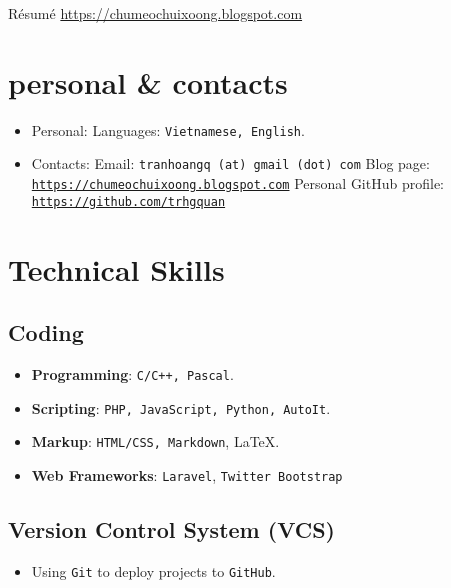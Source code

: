\documentclass{article}
\renewcommand{\maketitle}{
    \begin{center}
        {\huge\bfseries\theauthor}
        \linebreak\linebreak
        R\'esum\'e
        \linebreak
        \url{https://chumeochuixoong.blogspot.com}
    \end{center}
}
\begin{document}
    \author{Quan, Tran Hoang}
    \maketitle

    \section{personal \& contacts}
        \begin{itemize}
            \item Personal:
                \subitem Languages: \texttt{Vietnamese, English}.
            \item Contacts:
                \subitem Email: \texttt{tranhoangq (at) gmail (dot) com}
                \subitem Blog page: \texttt{\url{https://chumeochuixoong.blogspot.com}}
                \subitem Personal GitHub profile: \texttt{\url{https://github.com/trhgquan}}
        \end{itemize}

    \section{Technical Skills}
        \subsection{Coding}
        \begin{itemize}
            \item \textbf{Programming}: \texttt{C/C++, Pascal}.
            \item \textbf{Scripting}: \texttt{PHP, JavaScript, Python, AutoIt}.
            \item \textbf{Markup}: \texttt{HTML/CSS, Markdown}, \LaTeX.
            \item \textbf{Web Frameworks}: \texttt{Laravel}\cite{laravel}, \texttt{Twitter Bootstrap}\cite{bootstrap}
        \end{itemize}

        \subsection{Version Control System (VCS)}
        \begin{itemize}
            \item Using \texttt{Git} to deploy projects to \texttt{GitHub}.
        \end{itemize}
\end{document}
